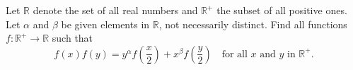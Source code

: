 Let $\mathbb{R}$ denote the set of all real numbers and $\mathbb{R}^+$ the subset of all positive ones. Let $\alpha$ and $\beta$ be given elements in $\mathbb{R}$, not necessarily distinct. Find all functions $f : \mathbb{R}^+ \to \mathbb{R}$ such that
\[
f(x)f(y) = y^{\alpha} f\left(\frac{x}{2}\right) + x^{\beta} f\left(\frac{y}{2}\right) \quad \text{for all } x \text{ and } y \text{ in } \mathbb{R}^+.
\]
